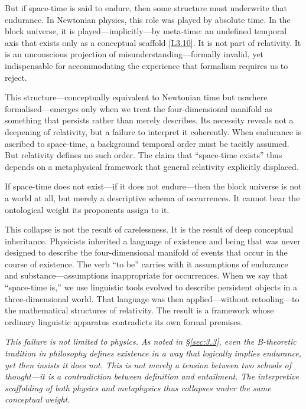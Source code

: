 \documentclass[12pt]{book}
\newcounter{logicanchor}
\newenvironment{logicanchorenv}[1]{\refstepcounter{logicanchor}\label{#1}}{}
\newcommand{\logiclink}[2]{\begin{logicanchorenv}{logic:#1}\end{logicanchorenv}\hyperref[appendix:#1]{[#1]}\xspace}
\begin{document}
But if space-time is said to endure, then some structure must underwrite that endurance. In Newtonian physics, this role was played by absolute time. In the block universe, it is played---implicitly---by meta-time: an undefined temporal axis that exists only as a conceptual scaffold \logiclink{L3.10}{}. It is not part of relativity.  It is an unconscious projection of misunderstanding---formally invalid, yet indispensable for accommodating the experience that formalism requires us to reject.

This structure---conceptually equivalent to Newtonian time but nowhere formalised---emerges only when we treat the four-dimensional manifold as something that persists rather than merely describes. Its necessity reveals not a deepening of relativity, but a failure to interpret it coherently. When endurance is ascribed to space-time, a background temporal order must be tacitly assumed. But relativity defines no such order. The claim that ``space-time exists'' thus depends on a metaphysical framework that general relativity explicitly displaced.

If space-time does not exist---if it does not endure---then the block universe is not a world at all, but merely a descriptive schema of occurrences. It cannot bear the ontological weight its proponents assign to it.

This collapse is not the result of carelessness. It is the result of deep conceptual inheritance. Physicists inherited a language of existence and being that was never designed to describe the four-dimensional manifold of events that occur in the course of existence. The verb ``to be'' carries with it assumptions of endurance and substance---assumptions inappropriate for occurrences. When we say that ``space-time is,'' we use linguistic tools evolved to describe persistent objects in a three-dimensional world. That language was then applied---without retooling---to the mathematical structures of relativity. The result is a framework whose ordinary linguistic apparatus contradicts its own formal premises.

\textit{This failure is not limited to physics. As noted in \S\ref{sec:3.3}, even the B-theoretic tradition in philosophy defines existence in a way that logically implies endurance, yet then insists it does not. This is not merely a tension between two schools of thought---it is a contradiction between definition and entailment. The interpretive scaffolding of both physics and metaphysics thus collapses under the same conceptual weight.}
\end{document}
